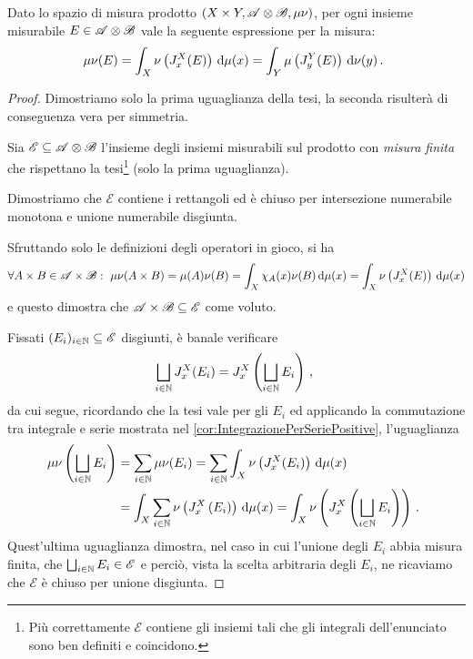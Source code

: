 \begin{proposition}\label{prop:PreTonelli}
	Dato lo spazio di misura prodotto $(X\times Y,\mathscr A\otimes\mathscr B,\mu\nu)$, per ogni insieme misurabile $E\in\mathscr A\otimes\mathscr B$ \sigfin[o] vale la seguente espressione per la misura:
	\begin{equation*}
		\mu\nu(E)=\int_X\nu\left(J_x^X(E)\right)\,\mathrm d\mu(x)=\int_Y\mu\left(J_y^Y(E)\right)\,\mathrm d\nu(y)\, \text{. }
	\end{equation*}
\end{proposition}
\begin{proof}
	\newcommand{\E}{\ensuremath{\mathscr E}}
	Dimostriamo solo la prima uguaglianza della tesi, la seconda risulterà di conseguenza vera per simmetria.
	
	Sia $\E\subseteq \A\otimes\B$ l'insieme degli insiemi misurabili sul prodotto con \emph{misura finita} che rispettano la tesi\footnote{Più correttamente $\E$ contiene gli insiemi tali che gli integrali dell'enunciato sono ben definiti e coincidono.} (solo la prima uguaglianza).
	
	Dimostriamo che $\E$ contiene i rettangoli ed è chiuso per intersezione numerabile monotona e unione numerabile disgiunta.
	
	Sfruttando solo le definizioni degli operatori in gioco, si ha
	\begin{equation*}
		\forall A\times B\in\mathscr A\times\mathscr B:\ \mu\nu(A\times B)=\mu(A)\nu(B)=\int_X \chi_A(x)\nu(B)\,\mathrm d\mu(x)=\int_X\nu\left(J_x^X(E)\right)\,\mathrm d\mu(x)
	\end{equation*}
	e questo dimostra che $\A\times\B\subseteq \E$ come voluto.
	
	Fissati $(E_i)_{i\in\N}\subseteq \E$ disgiunti, è banale verificare
	\begin{equation*}
		\bigsqcup_{i\in\mathbb N}J_x^X(E_i)=J_x^X\left(\bigsqcup_{i\in\mathbb N}E_i\right)\, \text{, }
	\end{equation*}
	da cui segue, ricordando che la tesi vale per gli $E_i$ ed applicando la commutazione tra integrale e serie mostrata nel \cref{cor:IntegrazionePerSeriePositive}, l'uguaglianza
	\begin{align*}
		\mu\nu\left(\bigsqcup_{i\in\mathbb N}E_i\right)&=\sum_{i\in\mathbb N}\mu\nu(E_i)=\sum_{i\in\mathbb N}\int_X \nu\left(J_x^X(E_i)\right)\,\mathrm d\mu(x)\\
		&=\int_X\sum_{i\in\mathbb N}\nu\left(J_x^X\left(E_i\right)\right)\,\mathrm d\mu(x)=\int_X\nu\left(J_x^X\left(\bigsqcup_{i\in\mathbb N}E_i\right)\right)\, \text{. }
	\end{align*}
	Quest'ultima uguaglianza dimostra, nel caso in cui l'unione degli $E_i$ abbia misura finita, che $\bigsqcup_{i\in\N}E_i\in\E$ e perciò, vista la scelta arbitraria degli $E_i$, ne ricaviamo che $\E$ è chiuso per unione disgiunta.
	

\end{proof}
